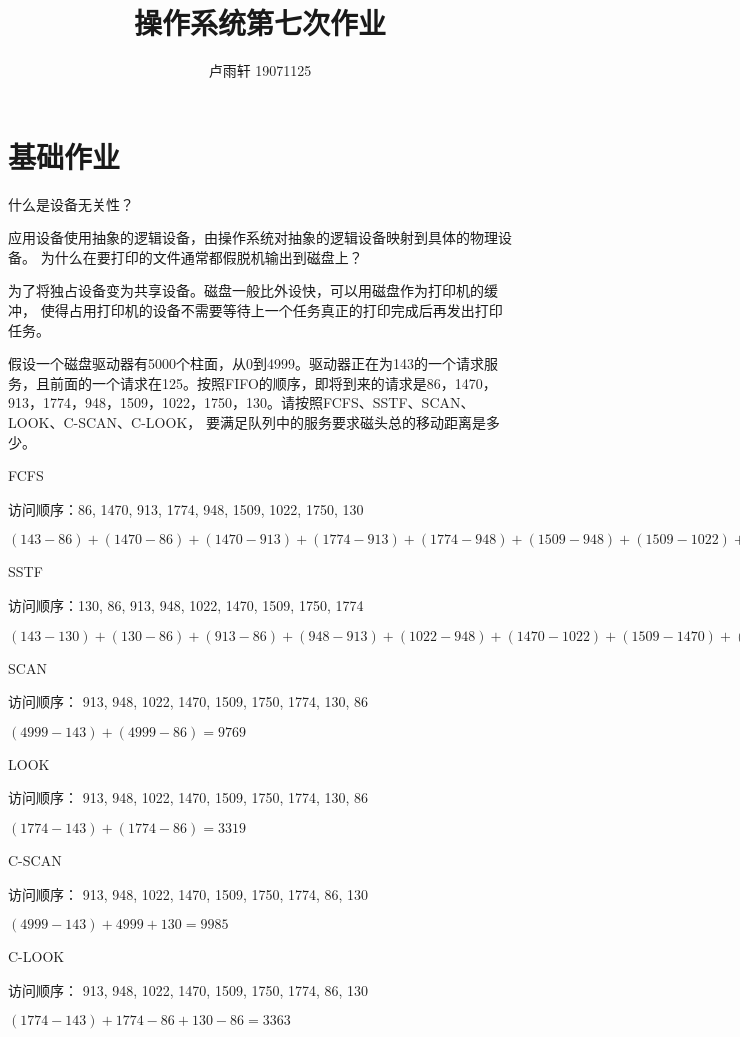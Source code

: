 \documentclass{ctexart}
\title{操作系统第七次作业}
\author{卢雨轩 19071125}
\begin{document}
\maketitle

\section*{基础作业}
\begin{outline}[enumerate]
    \1 什么是设备无关性？

    应用设备使用抽象的逻辑设备，由操作系统对抽象的逻辑设备映射到具体的物理设备。
    \1 为什么在要打印的文件通常都假脱机输出到磁盘上？

    为了将独占设备变为共享设备。磁盘一般比外设快，可以用磁盘作为打印机的缓冲，
    使得占用打印机的设备不需要等待上一个任务真正的打印完成后再发出打印任务。
    
    \1 假设一个磁盘驱动器有5000个柱面，从0到4999。驱动器正在为143的一个请求服务，且前面的一个请求在125。按照FIFO的顺序，即将到来的请求是86，1470，913，1774，948，1509，1022，1750，130。请按照FCFS、SSTF、SCAN、LOOK、C-SCAN、C-LOOK， 要满足队列中的服务要求磁头总的移动距离是多少。

        \2 FCFS

        访问顺序：86, 1470, 913, 1774, 948, 1509, 1022, 1750, 130
        
        $(143 - 86) + (1470 - 86) + (1470 - 913) + (1774 - 913) + (1774 - 948) + (1509 - 948) + (1509 - 1022) + (1750 - 1022) + (1750 - 130) = 7081$

        \2 SSTF

        访问顺序：130, 86, 913, 948, 1022, 1470, 1509, 1750, 1774

        $(143 - 130) + (130 - 86) + (913 - 86) + (948 - 913) + (1022 - 948) + (1470 - 1022) + (1509 - 1470) + (1750 - 1509) + (1774 - 1750) = 1745$

        \2 SCAN
        
        访问顺序： 913, 948, 1022, 1470, 1509, 1750, 1774, 130, 86

        $(4999 - 143) + (4999 - 86) = 9769$

        \2 LOOK

        访问顺序： 913, 948, 1022, 1470, 1509, 1750, 1774, 130, 86

        $(1774 - 143) + (1774 - 86) = 3319$

        \2 C-SCAN

        访问顺序： 913, 948, 1022, 1470, 1509, 1750, 1774, 86, 130

        $(4999 - 143) + 4999 + 130 = 9985$

        \2 C-LOOK

        访问顺序： 913, 948, 1022, 1470, 1509, 1750, 1774, 86, 130

        $(1774 - 143) + 1774 - 86 + 130 - 86 = 3363$
\end{outline}
\end{document}
